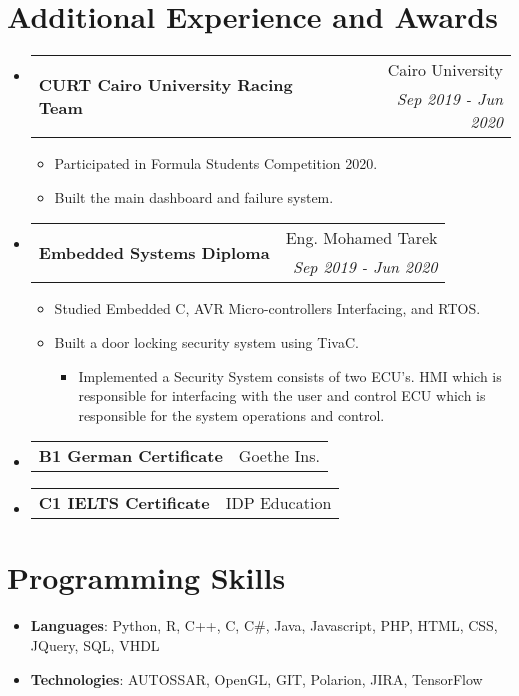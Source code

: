 \documentclass[letterpaper,11pt]{article}
\makeatletter
\newcommand{\CvSubheadingWithoutTitle}[3]{
  \vspace{-1pt}\item
    \begin{tabular*}{0.97\textwidth}{l@{\extracolsep{\fill}}r}
    \multirow{2}{*}{\textbf{#1}} & #2 \\
     & \textit{\small #3} \\
    \end{tabular*}\vspace{-5pt}
}
\newcommand{\CvSubSubheadingWithoutTitleAndDate}[2]{
  \vspace{-1pt}\item
    \begin{tabular*}{0.97\textwidth}{l@{\extracolsep{\fill}}r}
    {\textbf{#1}} & #2 \\
    \end{tabular*}\vspace{-10pt}
}
\newcommand{\CvSubHeadingListStart}{\begin{itemize}[leftmargin=*,topsep = 0pt]}
\newcommand{\CvSubHeadingListEnd}{\end{itemize}}
\makeatother
\begin{document}
%
%
\section{Additional Experience and Awards}
    \CvSubHeadingListStart
        \CvSubheadingWithoutTitle
        {CURT Cairo University Racing Team}{Cairo University}
        {Sep 2019 - Jun 2020 }
            {\begin{itemize}[topsep = -5pt, itemsep = -2pt]
                \item Participated in Formula Students Competition 2020.
                \item Built the main dashboard and failure system.
            \end{itemize}}
    \CvSubheadingWithoutTitle
        {Embedded Systems Diploma}{Eng. Mohamed Tarek}
        {Sep 2019 - Jun 2020 }
            \begin{itemize}[topsep = -5pt, itemsep = -2pt]
                \item Studied Embedded C, AVR Micro-controllers Interfacing, and RTOS.
                \item Built a door locking security system using TivaC.
                \begin{itemize}[topsep = -1pt]
                    \item Implemented a Security System consists of two ECU’s. HMI which is responsible for interfacing with 
                    the user and control ECU which is responsible for the system operations and control.
                \end{itemize} 
            \end{itemize}
    \CvSubSubheadingWithoutTitleAndDate
    {B1 German Certificate} {Goethe Ins.}
    \CvSubSubheadingWithoutTitleAndDate
    {C1 IELTS Certificate} { IDP Education}
    \CvSubHeadingListEnd
%
\section{Programming Skills}
 \CvSubHeadingListStart
   \item{
     \textbf{Languages}{: Python, R, C++, C, C\#, Java, Javascript, PHP, HTML, CSS, JQuery, SQL, VHDL}}
   \item{
    \textbf{Technologies}{: AUTOSSAR, OpenGL, GIT, Polarion, JIRA, TensorFlow}
   }  
 \CvSubHeadingListEnd


\end{document}
